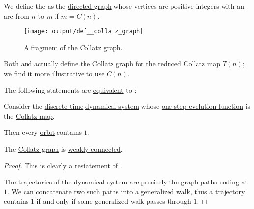 \begin{definition}\label{def:collatz_graph}
  We define the  as the \hyperref[def:directed_graph]{directed graph} whose vertices are positive integers with an arc from \( n \) to \( m \) if \( m = C(n) \).

  \begin{figure}[!ht]
    \centering
    \texttt{[image: output/def\_\_collatz\_graph]}
    \caption{A fragment of the \hyperref[def:collatz_graph]{Collatz graph}.}\label{fig:def:collatz_graph}
  \end{figure}
\end{definition}
\begin{comments}
  \item Both  and  actually define the Collatz graph for the reduced Collatz map \( T(n) \); we find it more illustrative to use \( C(n) \).
\end{comments}

\begin{theorem}\label{thm:collatz_conjectures_equivalences}
  The following statements are \hyperref[def:logical_theory/equivalent]{equivalent} to :
  \begin{thmenum}[series=thm:axiom_of_choice_equivalences]
     Consider the \hyperref[def:discrete_dynamical_system]{discrete-time} \hyperref[def:dynamical_system]{dynamical system} whose \hyperref[def:one_step_evolution_function]{one-step evolution function} is the \hyperref[def:collatz_map]{Collatz map}.

    Then every \hyperref[def:dynamical_system_trajectory]{orbit} contains \( 1 \).

     The \hyperref[def:collatz_graph]{Collatz graph} is \hyperref[def:graph_connectedness/weak]{weakly connected}.
  \end{thmenum}
\end{theorem}
\begin{proof}
   This is clearly a restatement of .

   The trajectories of the dynamical system are precisely the graph paths ending at \( 1 \). We can concatenate two such paths into a generalized walk, thus a trajectory contains \( 1 \) if and only if some generalized walk passes through \( 1 \).
\end{proof}
